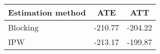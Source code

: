 \begin{center}
\begin{tabular}{lcc}
\hline\hline
Estimation method & ATE & ATT \\ [0.5ex]
\hline
Blocking & -210.77 & -204.22 \\ 
IPW              & -213.17   & -199.87 \\ 
\hline\hline
\end{tabular}
\end{center}
